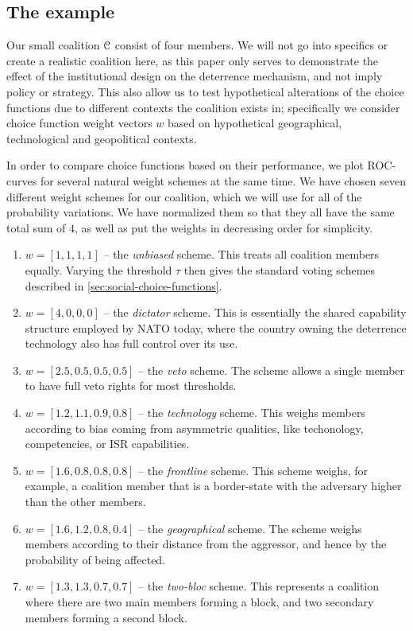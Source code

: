 \subsection{The example}
\label{ssec:the-example}
Our small coalition $\EuScript{C}$ consist of four members. We will not go into specifics or create a realistic coalition here, as this paper only serves to demonstrate the effect of the institutional design on the deterrence mechanism, and not imply policy or strategy. This also allow us to test hypothetical alterations of the choice functions due to different contexts the coalition exists in; specifically we consider choice function weight vectors $w$ based on hypothetical geographical, technological and geopolitical contexts. 

In order to compare choice functions based on their performance, we plot ROC-curves for several natural weight schemes at the same time. We have chosen seven different weight schemes for our coalition, which we will use for all of the probability variations. We have normalized them so that they all have the same total sum of $4$, as well as put the weights in decreasing order for simplicity. 
\begin{enumerate}
    \item $w = [1,1,1,1]$ -- the \emph{unbiased} scheme. This treats all coalition members equally. Varying the threshold $\tau$ then gives the standard voting schemes described in \cref{sec:social-choice-functions}. 
    \item $w = [4,0,0,0]$ -- the \emph{dictator} scheme. This is essentially the shared capability structure employed by NATO today, where the country owning the deterrence technology also has full control over its use.  
    \item $w = [2.5, 0.5, 0.5, 0.5]$ -- the \emph{veto} scheme. The scheme allows a single member to have full veto rights for most thresholds. 
    \item $w = [1.2, 1.1, 0.9, 0.8]$ -- the \emph{technology} scheme. This weighs members according to bias coming from asymmetric qualities, like techonology, competencies, or ISR capabilities. 
    \item $w = [1.6, 0.8, 0.8, 0.8]$ -- the \emph{frontline} scheme. This scheme weighs, for example, a coalition member that is a border-state with the adversary higher than the other members. 
    \item $w = [1.6, 1.2, 0.8, 0.4]$ -- the \emph{geographical} scheme. The scheme weighs members according to their distance from the aggressor, and hence by the probability of being affected. 
    \item $w = [1.3, 1.3, 0.7, 0.7]$ -- the \emph{two-bloc} scheme. This represents a coalition where there are two main members forming a block, and two secondary members forming a second block. 
\end{enumerate}

